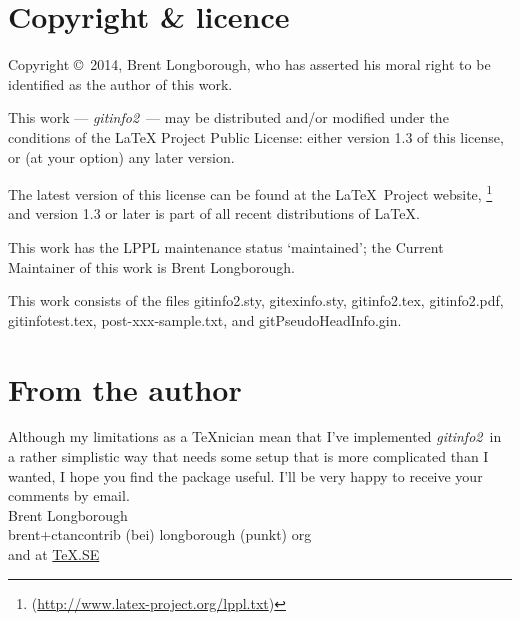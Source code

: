 \documentclass[a4paper,12pt,twoside,openany]{memoir}
\newcommand{\sfit}[1]{\textit{#1}}
\newcommand{\tpname}{\sfit{gitinfo2}}
\begin{document}
\section{Copyright \& licence}
Copyright \copyright\ 2014, Brent Longborough,
who has asserted his moral right
to be identified as the author of this work.

This work --- \tpname\ --- may be distributed and/or modified under the
conditions of the LaTeX Project Public License: either version 1.3
of this license, or (at your option) any later version.

The latest version of this license can be found
at the \LaTeX\ Project website,%
\footnote{(\url{http://www.latex-project.org/lppl.txt})}
and version 1.3 or later is part of all recent distributions of
\LaTeX.

This work has the LPPL maintenance status `maintained';
the Current Maintainer of this work is Brent Longborough.

This work consists of the files
gitinfo2.sty, gitexinfo.sty, gitinfo2.tex, gitinfo2.pdf,
gitinfotest.tex, post-xxx-sample.txt,
and gitPseudoHeadInfo.gin.

\section{From the author}
Although my limitations as a \TeX nician
mean that I've implemented \tpname\ in a rather simplistic way
that needs some setup that is more complicated than I wanted,
I hope you find the package useful.
I'll be very happy to receive your comments by email.\\[\baselineskip]
Brent Longborough\\[\baselineskip]
\textsf{brent+ctancontrib (bei) longborough (punkt) org}\\
and at \href{http://tex.stackexchange.com/users/344/brent-longborough}{\TeX.SE}
\clearpage
\raggedright
\printpagenotes
\end{document}
